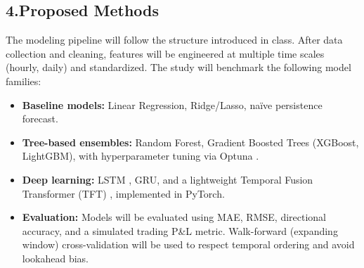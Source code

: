 \documentclass[12pt]{article}
\begin{document}
\subsection*{4.\quad Proposed Methods}

The modeling pipeline will follow the structure introduced in class.
After data collection and cleaning, features will be engineered at multiple time scales (hourly, daily) and standardized.
The study will benchmark the following model families:

\begin{itemize}[leftmargin=2em]
  \item \textbf{Baseline models:} Linear Regression, Ridge/Lasso, na\"ive persistence forecast.
  \item \textbf{Tree-based ensembles:} Random Forest, Gradient Boosted Trees (XGBoost, LightGBM), with hyperparameter tuning via Optuna \citep{Chen2016}.
  \item \textbf{Deep learning:} LSTM \citep{Hochreiter1997}, GRU, and a lightweight Temporal Fusion Transformer (TFT) \citep{Lim2021}, implemented in PyTorch.
  \item \textbf{Evaluation:} Models will be evaluated using MAE, RMSE, directional accuracy, and a simulated trading P\&L metric. Walk-forward (expanding window) cross-validation will be used to respect temporal ordering and avoid lookahead bias.
\end{itemize}



\end{document}
